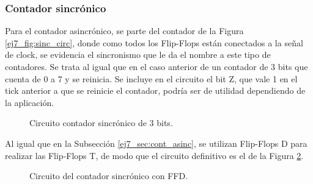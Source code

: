\subsubsection{Contador sincr\'onico}
\noindent
Para el contador asincr\'onico, se parte del contador de la Figura \ref{ej7_fig:sinc_circ}, donde como todos los Flip-Flops est\'an conectados a la señal de clock, se evidencia el sincronismo que le da el nombre a este tipo de contadores. Se trata al igual que en el caso anterior de un contador de 3 bits que cuenta de 0 a 7 y se reinicia. Se incluye en el circuito el bit Z, que vale 1 en el tick anterior a que se reinicie el contador, podr\'ia ser de utilidad dependiendo de la aplicaci\'on.
%
\begin{figure}[H]
	\centering
	\caption{Circuito contador sincr\'onico de 3 bits.}
	\label{ej7_fig:sinc_circ_final}
\end{figure}
%
\noindent
Al igual que en la Subsecci\'on \ref{ej7_sec:cont_asinc}, se utilizan Flip-Flops D para realizar las Flip-Flops T, de modo que el circuito definitivo es el de la Figura \ref{ej7_fig:sinc_circ_final}.
%
\begin{figure}[H]
	\centering
	\caption{Circuito del contador sincr\'onico con FFD.}
	\label{ej7_fig:sinc_circ_final}
\end{figure}
%
